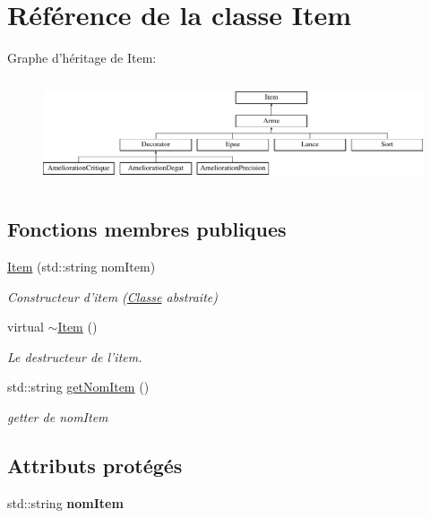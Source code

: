 \hypertarget{classItem}{\section{Référence de la classe Item}
\label{classItem}
}
Graphe d'héritage de Item\-:\begin{figure}[H]
\begin{center}
\leavevmode
\includegraphics[height=3.132867cm]{classItem}
\end{center}
\end{figure}
\subsection*{Fonctions membres publiques}
\begin{DoxyCompactItemize}
\item 
\hyperlink{classItem_a9b72af940c9e375038de5ea420f471f0}{Item} (std\-::string nom\-Item)
\begin{DoxyCompactList}\small\item\em Constructeur d'item (\hyperlink{classClasse}{Classe} abstraite) \end{DoxyCompactList}\item 
\hypertarget{classItem_a11663c84075b78c3ae5e30fdfcd7c458}{virtual \hyperlink{classItem_a11663c84075b78c3ae5e30fdfcd7c458}{$\sim$\-Item} ()}\label{classItem_a11663c84075b78c3ae5e30fdfcd7c458}

\begin{DoxyCompactList}\small\item\em Le destructeur de l'item. \end{DoxyCompactList}\item 
std\-::string \hyperlink{classItem_abd58e71362b471f03b4d520c10c1545d}{get\-Nom\-Item} ()
\begin{DoxyCompactList}\small\item\em getter de nom\-Item \end{DoxyCompactList}\end{DoxyCompactItemize}
\subsection*{Attributs protégés}
\begin{DoxyCompactItemize}
\item 
\hypertarget{classItem_a068ef6dbb8cea714174d6956e89b1042}{std\-::string {\bfseries nom\-Item}}\label{classItem_a068ef6dbb8cea714174d6956e89b1042}

\end{DoxyCompactItemize}


